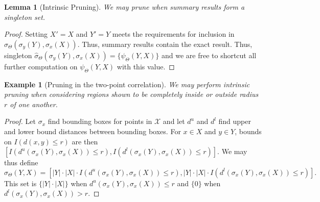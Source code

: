 \documentclass{article}
\newtheorem{lemma}{Lemma}
\newtheorem{example} {Example}
\newcommand{\maybekillspace}{\vspace{-0.08in}}
\newcommand{\killspace}{\vspace{-0.08in}}
\newcommand{\GNP}[1][\psi]{{#1}_{\Theta}}
\newcommand{\sigmahat}{\mathbin{\widehat{\sigma}}}
\newcommand{\disthrectmin}{d^{l}}
\newcommand{\disthrectmax}{d^{u}}
\begin{document}
\begin{lemma}[Intrinsic Pruning]
  We may prune when summary results form a singleton set.
\end{lemma}
\killspace
\begin{proof}
  Setting $X' = X$ and $Y' = Y$ meets the requirements for inclusion in $\GNP[\sigmahat](\sigma_y(Y),\sigma_x(X))$.
  Thus, summary results contain the exact result.
  Thus, singleton $\GNP[\sigmahat](\sigma_y(Y),\sigma_x(X)) = \{\GNP(Y,X)\}$ and we are free to shortcut all further computation on $\GNP(Y,X)$ with this value.
\end{proof}
\killspace
\begin{example}[Pruning in the two-point correlation]
  We may perform intrinsic pruning when considering regions shown to
  be completely inside or outside radius $r$ of one another.
\end{example}
\killspace
\begin{proof}
  Let $\sigma_x$ find bounding boxes for points in $\mathcal{X}$ and
  let $\disthrectmax$ and $\disthrectmin$ find upper and lower bound distances between bounding boxes.
  For $x \in X$ and $y \in Y$, bounds on $I(d(x,y) \leq r)$ are then $\left[
  I(\disthrectmax(\sigma_x(Y),\sigma_x(X)) \leq r),
  I(\disthrectmin(\sigma_x(Y),\sigma_x(X)) \leq r) \right]$.
  We may thus define
  \[
  \GNP[\sigmahat](Y,X) = \left[ |Y| \cdot |X| \cdot I(\disthrectmax(\sigma_x(Y),\sigma_x(X)) \leq r), |Y| \cdot |X| \cdot I(\disthrectmin(\sigma_x(Y),\sigma_x(X)) \leq r) \right].
  \]
  This set is $\{|Y| \cdot |X|\}$ when
  $\disthrectmax(\sigma_x(Y),\sigma_x(X)) \leq r$ and $\{0\}$ when
  $\disthrectmin(\sigma_x(Y),\sigma_x(X)) > r$.
\end{proof}
\maybekillspace
\end{document}
